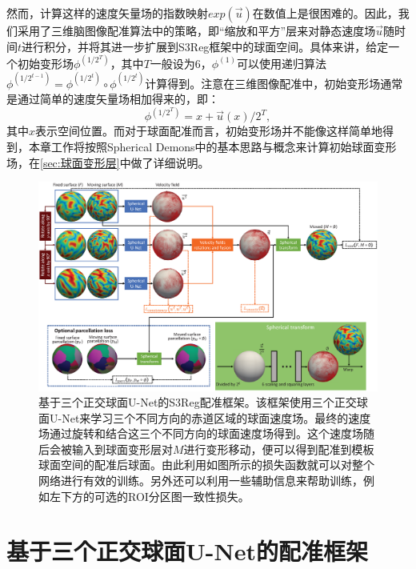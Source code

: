 然而，计算这样的速度矢量场的指数映射$exp(\overrightarrow{u})$在数值上是很困难的。因此，我们采用了三维脑图像配准算法中的策略\cite{dalca2018unsupervised,krebs2019learning}，即“缩放和平方”层\cite{arsigny2006log}来对静态速度场$\overrightarrow{u}$随时间$t$进行积分，并将其进一步扩展到S3Reg框架中的球面空间。具体来讲，给定一个初始变形场$\phi^{(1/2^T)}$，其中$T$一般设为6，$\phi^{(1)}$可以使用递归算法$\phi^{(1/2^{t-1})}=\phi^{(1/2^t)}\circ\phi^{(1/2^t)}$计算得到。注意在三维图像配准中，初始变形场通常是通过简单的速度矢量场相加得来的，即：
\begin{equation}
\phi^{(1/2^T)}=x+\overrightarrow{u}(x)/2^T,
\end{equation}
其中$x$表示空间位置。而对于球面配准而言，初始变形场并不能像这样简单地得到，本章工作将按照Spherical Demons中的基本思路与概念\cite{yeo2009spherical}来计算初始球面变形场，在\ref{sec:球面变形层}中做了详细说明。
\begin{figure}[h]
	\centering
	\includegraphics[width=\linewidth]{figure/network.eps}
	\caption{基于三个正交球面U-Net的S3Reg配准框架。该框架使用三个正交球面U-Net来学习三个不同方向的赤道区域的球面速度场。最终的速度场通过旋转和结合这三个不同方向的球面速度场得到。这个速度场随后会被输入到球面变形层对$M$进行变形移动，便可以得到配准到模板球面空间的配准后球面。由此利用如图所示的损失函数就可以对整个网络进行有效的训练。另外还可以利用一些辅助信息来帮助训练，例如左下方的可选的ROI分区图一致性损失。}
	\label{fig:S3Reg_network}
\end{figure}

\section{基于三个正交球面U-Net的配准框架}\label{sec:基于三个正交球面U-Net的配准框架}


